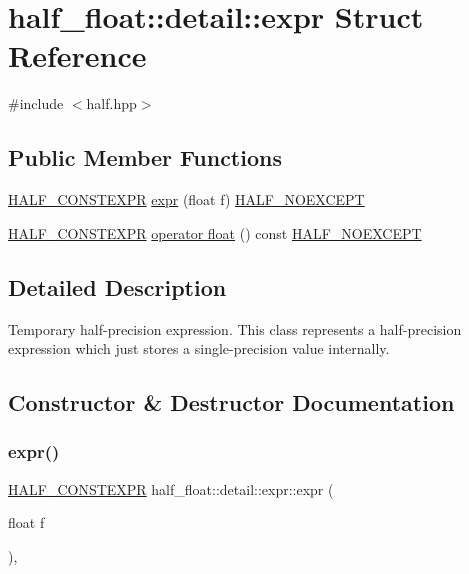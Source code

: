 \hypertarget{structhalf__float_1_1detail_1_1expr}{}\section{half\+\_\+float\+:\+:detail\+:\+:expr Struct Reference}
\label{structhalf__float_1_1detail_1_1expr}


{\ttfamily \#include $<$half.\+hpp$>$}

\subsection*{Public Member Functions}
\begin{DoxyCompactItemize}
\item 
\hyperlink{half_8hpp_ace3116a3e2cd66dd15780b92060987c7}{H\+A\+L\+F\+\_\+\+C\+O\+N\+S\+T\+E\+X\+PR} \hyperlink{structhalf__float_1_1detail_1_1expr_a2a66f42f413a59b38a8d2cef269ea446}{expr} (float f) \hyperlink{half_8hpp_a04e7940852b33adbb81a8249fef1c508}{H\+A\+L\+F\+\_\+\+N\+O\+E\+X\+C\+E\+PT}
\item 
\hyperlink{half_8hpp_ace3116a3e2cd66dd15780b92060987c7}{H\+A\+L\+F\+\_\+\+C\+O\+N\+S\+T\+E\+X\+PR} \hyperlink{structhalf__float_1_1detail_1_1expr_acf4d1ca1eb867d11b0529e73b2e8e9dd}{operator float} () const \hyperlink{half_8hpp_a04e7940852b33adbb81a8249fef1c508}{H\+A\+L\+F\+\_\+\+N\+O\+E\+X\+C\+E\+PT}
\end{DoxyCompactItemize}


\subsection{Detailed Description}
Temporary half-\/precision expression. This class represents a half-\/precision expression which just stores a single-\/precision value internally. 

\subsection{Constructor \& Destructor Documentation}
\mbox{\label{structhalf__float_1_1detail_1_1expr_a2a66f42f413a59b38a8d2cef269ea446}} 
\subsubsection{\texorpdfstring{expr()}{expr()}}
{\footnotesize\ttfamily \hyperlink{half_8hpp_ace3116a3e2cd66dd15780b92060987c7}{H\+A\+L\+F\+\_\+\+C\+O\+N\+S\+T\+E\+X\+PR} half\+\_\+float\+::detail\+::expr\+::expr (\begin{DoxyParamCaption}\item[{float}]{f }\end{DoxyParamCaption})\hspace{0.3cm}{\ttfamily [inline]}, {\ttfamily [explicit]}}

